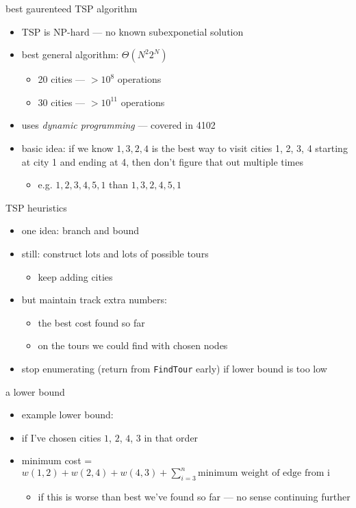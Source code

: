 \begin{frame}{best gaurenteed TSP algorithm}
\begin{itemize}
\item TSP is NP-hard --- no known subexponetial solution
\item best general algorithm: $\Theta(N^2 2^N)$
    \begin{itemize}
    \item 20 cities --- $>10^8$ operations
    \item 30 cities --- $>10^11$ operations
    \end{itemize}
\item uses \textit{dynamic programming} --- covered in 4102
\vspace{.5cm}
\item basic idea: if we know $1, 3, 2, 4$ is the best way to visit cities 1, 2, 3, 4 starting at city 1 and ending at 4, then don't figure that out multiple times
    \begin{itemize}
    \item e.g. $1, 2, 3, 4, 5, 1$  than $1, 3, 2, 4, 5, 1$
    \end{itemize}
\end{itemize}
\end{frame}

\begin{frame}{TSP heuristics}
\begin{itemize}
\item one idea: branch and bound
\item still: construct lots and lots of possible tours
    \begin{itemize}
    \item keep adding cities
    \end{itemize}
\item but maintain track extra numbers:
    \begin{itemize}
    \item the best cost found so far
    \item {} on the tours we could find with chosen nodes
    \end{itemize}
\item stop enumerating (return from \texttt{FindTour} early) if lower bound is too low
\end{itemize}
\end{frame}

\begin{frame}{a lower bound}
\begin{itemize}
\item example lower bound:
\vspace{.5cm}
\item if I've chosen cities $1$, $2$, $4$, $3$ in that order
\item minimum cost = $w(1,2)+w(2,4)+w(4,3)+\sum_{i=3}^n\text{minimum weight of edge from i}$
    \begin{itemize}
    \item if this is worse than best we've found so far --- no sense continuing further
    \end{itemize}
\end{itemize}
\end{frame}


